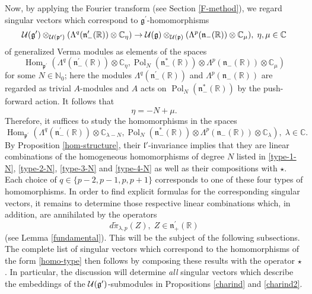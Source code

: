 \documentclass[a4paper,12pt,reqno]{amsart}
\numberwithin{theorem}{subsection}
\numberwithin{equation}{section}
\begin{document}
Now, by applying the Fourier transform (see Section \ref{F-method}), we regard
singular vectors which correspond to ${{\mathfrak g}}^\prime$-homomorphisms
\begin{equation*}
   {\fam2U}({{\mathfrak g}}^\prime) \otimes_{{\fam2U}({{\mathfrak p}}^\prime)}(\Lambda^{q}({{\mathfrak n}}_-^\prime({\mathbb{R}}))
   \otimes {\mathbb{C}}_{\eta}) \to {\fam2U}({{\mathfrak g}})\otimes_{{\fam2U}({{\mathfrak p}})}(\Lambda^p({{\mathfrak n}}_-({\mathbb{R}})) \otimes {\mathbb{C}}_\mu),
   \; \eta, \mu \in {\mathbb{C}}
\end{equation*}
of generalized Verma modules as elements of the spaces
$$
   {\operatorname{Hom}}_{{{\mathfrak p}}^\prime}(\Lambda^q({{\mathfrak n}}_-^\prime({\mathbb{R}})) \otimes {\mathbb{C}}_{\eta},
   {\operatorname{Pol}}_N({{\mathfrak n}}_-^*({\mathbb{R}})) \otimes \Lambda^p({{\mathfrak n}}_-({\mathbb{R}})) \otimes {\mathbb{C}}_\mu)
$$
for some $N \in {\mathbb{N}}_0$; here the modules $\Lambda^q({{\mathfrak n}}_-^\prime({\mathbb{R}}))$ and
$\Lambda^p({{\mathfrak n}}_-({\mathbb{R}}))$ are regarded as trivial $A$-modules and $A$ acts on
${\operatorname{Pol}}_N({{\mathfrak n}}_-^*({\mathbb{R}}))$ by the push-forward action. It follows that
$$
    \eta = -N + \mu.
$$
Therefore, it suffices to study the homomorphisms in the spaces
\begin{equation}\label{homo-type}
   {\operatorname{Hom}}_{{{\mathfrak p}}^\prime}(\Lambda^q({{\mathfrak n}}_-^\prime({\mathbb{R}})) \otimes {\mathbb{C}}_{\lambda-N},
   {\operatorname{Pol}}_N({{\mathfrak n}}_-^*({\mathbb{R}})) \otimes \Lambda^p({{\mathfrak n}}_-({\mathbb{R}})) \otimes {\mathbb{C}}_\lambda), \; \lambda \in {\mathbb{C}}.
\end{equation}
By Proposition \ref{hom-structure}, their ${{\mathfrak l}}'$-invariance implies that they
are linear combinations of the homogeneous homomorphisms of degree $N$ listed
in \eqref{type-1-N}, \eqref{type-2-N}, \eqref{type-3-N} and \eqref{type-4-N} as
well as their compositions with $\star$. Each choice of $q \in
\{p-2,p-1,p,p+1\}$ corresponds to one of these four types of homomorphisms. In
order to find explicit formulas for the corresponding singular vectors, it
remains to determine those respective linear combinations which, in addition,
are annihilated by the operators
\begin{equation}\label{major}
   {d} \tilde{\pi}_{\lambda,p}(Z), \; Z \in {{\mathfrak n}}_+^\prime({\mathbb{R}})
\end{equation}
(see Lemma \ref{fundamental}).  This will be the subject of the following
subsections. The complete list of singular vectors which correspond to the
homomorphisms of the form \eqref{homo-type} then follows by composing these
results with the operator $\star$. In particular, the discussion will determine
{\em all} singular vectors which describe the embeddings of the
${\fam2U}({{\mathfrak g}}^\prime)$-submodules in Propositions \ref{charind} and
\ref{charind2}.
\end{document}
